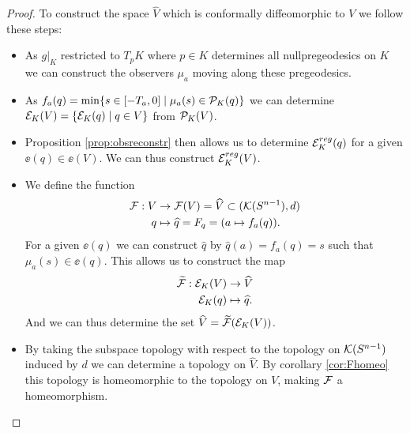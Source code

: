 \begin{proof}
    
    To construct the space $\widehat{V}$ which is conformally diffeomorphic to $V$ we follow these steps:
    \begin{itemize}
        \item As $g\rvert_K$ restricted to $T_pK$ where $p\in K$ determines all nullpregeodesics on $K$ we can construct the observers $\mu_a$ moving along these pregeodesics.
        \item As $f_a(q) = \min \{s\in [-T_a,0] \mid \mu_a(s) \in {\mathcal{P}}_K(q)\}$ we can determine ${\mathcal{E}}_K(V) = \{{{\mathcal{E}}_K}(q) \mid q\in V\}$ from ${\mathcal{P}}_K(V)$.
        \item Proposition \ref{prop:obsreconstr} then allows us to determine ${{\mathcal{E}}^{reg}_K}(q)$ for a given $\ee(q)\in \ee(V)$. We can thus construct ${{\mathcal{E}}^{reg}_K}(V)$.
        \item We define the function 
        \begin{align*}
            \mathcal{F}:V&\to \mathcal{F}(V) = \widehat{V} \subset ({\mathcal{K}}({S^{n-1}}),d)\\
            q &\mapsto \widehat{q} = F_q = (a\mapsto f_a(q)).
        \end{align*}
        For a given $\ee(q)$ we can construct $\widehat{q}$ by $\widehat{q}(a) = f_a(q) = s$ such that $\mu_a(s) \in \ee(q)$.
        This allows us to construct the map
        \begin{align*}
            \widetilde{\mathcal{F}}:{{\mathcal{E}}_K}(V)&\to \widehat{V}\\
            {{\mathcal{E}}_K}(q) &\mapsto \widehat{q}.
        \end{align*}
        And we can thus determine the set $\widehat{V} = \widetilde{\mathcal{F}}({{\mathcal{E}}_K}(V))$.

        \item By taking the subspace topology with respect to the topology on ${\mathcal{K}}({S^{n-1}})$ induced by $d$ we can determine a topology on $\widehat{V}$. By corollary \ref{cor:Fhomeo} this topology is homeomorphic to the topology on $V$, making $\mathcal{F}$ a homeomorphism.
        
        

\end{itemize}
\end{proof}
